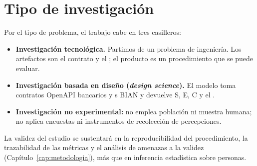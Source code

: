 \section{Tipo de investigación}

Por el tipo de problema, el trabajo cabe en tres casilleros:

\begin{itemize}
  \item \textbf{Investigación tecnológica.} Partimos de un problema de ingeniería. Los artefactos
        son el contrato y el \ServiceDomain{}; el producto es un procedimiento que se puede evaluar.
  \item \textbf{Investigación basada en diseño (\textit{design science}).} El modelo toma contratos
        OpenAPI bancarios y \ServiceDomain{}s BIAN y devuelve S, E, C y el \AlignmentScore{}.
  \item \textbf{Investigación no experimental:} no emplea población ni muestra humana; no aplica
        encuestas ni instrumentos de recolección de percepciones.
\end{itemize}

La validez del estudio se sustentará en la reproducibilidad del procedimiento, la trazabilidad de
las métricas y el análisis de amenazas a la validez (Capítulo~\ref{cap:metodologia}), más que en
inferencia estadística sobre personas.
